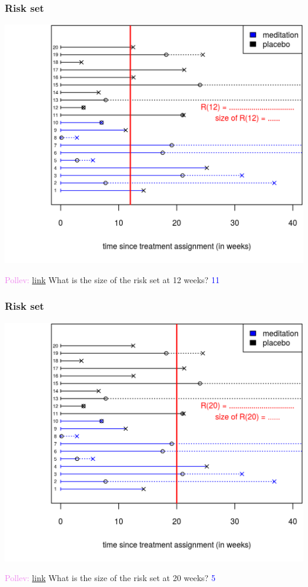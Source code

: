 \documentclass[10pt,t]{beamer}
\begin{document}
\begin{frame}
\frametitle{Risk set}
\begin{center}
\includegraphics[height=0.8\textheight]{figs/risk_set_movie_4.png}
\end{center}

\textcolor{violet}{Pollev: \href{https://PollEv.com/free_text_polls/LvnDxrrdXRF0cixtAUMmz/respond}{link}} What is the size of the risk set at 12 weeks? \pause\textcolor{blue}{11}
\end{frame}

\begin{frame}
\frametitle{Risk set}
\begin{center}
\includegraphics[height=0.8\textheight]{figs/risk_set_movie_5.png}
\end{center}

\textcolor{violet}{Pollev: \href{https://PollEv.com/free_text_polls/jVdeAH30QWlhfZZjPcUd1/respond}{link}} What is the size of the risk set at 20 weeks?  \pause\textcolor{blue}{5}
\end{frame}
\end{document}
